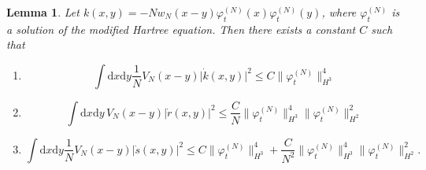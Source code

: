 \documentclass[11pt,a4paper,draft,DIV11]{scrartcl}	%
\newtheorem{lem}[thm]{Lemma}
\newcommand{\di}{\textrm{d}}		%
\newcommand{\norm}[1]{\lVert#1\rVert}	%
\newcommand{\ph}{\varphi_t^{(N)}}	%
\newcommand{\bd}{\begin{displaymath}}			%
\newcommand{\ed}{\end{displaymath}}
\begin{document}
\begin{lem}
\label{lem:dottedests2}
Let $k(x,y) = -N w_N(x-y) \ph(x) \ph(y)$, where $\ph$ is a solution of the modified Hartree equation. Then there exists a constant $C$ such that
\begin{enumerate}
 \item
\bd
\int \di x \di y \frac{1}{N} V_N(x-y) \lvert \dot k(x,y)\rvert^2 \leq C \norm{\ph}_{H^3}^4
\ed 
 \item
\bd
\int \di x\di y\, V_N(x-y) \lvert \dot r(x,y)\rvert^2 \leq \frac{C}{N} \norm{\ph}_{H^3}^4 \norm{\ph}_{H^2}^2
\ed
 \item
\bd
\int \di x\di y\frac{1}{N} V_N(x-y) \lvert \dot s(x,y)\rvert^2 \leq C \norm{\ph}_{H^3}^4 + \frac{C}{N^2} \norm{\ph}_{H^3}^4 \norm{\ph}_{H^2}^2.
\ed
\end{enumerate}
\end{lem}
\end{document}
